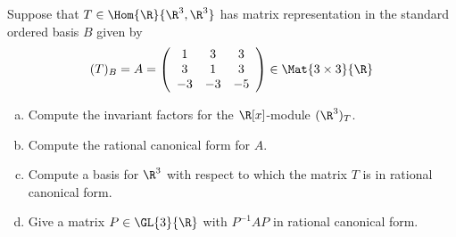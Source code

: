 \documentclass[10pt]{amsart}
\begin{document}
\begin{thm}
  Suppose that $T \in \Hom{\R}{\R^3, \R^3}$ has matrix representation in the standard ordered basis $B$ given by 
  $$(T)_B = A = \left(
  \begin{array}{ccc}
    1 & 3 & 3\\
    3 & 1 & 3\\
    -3 & -3 & -5
  \end{array}
  \right) \in \Mat{3 \times 3}{\R}$$
  \begin{enumerate}[(a)]
  \item
    Compute the invariant factors for the $\R[x]$-module $(\R^3)_T$.
  \item
    Compute the rational canonical form for $A$.
  \item
    Compute a basis for $\R^3$ with respect to which the matrix $T$ is in rational canonical form.
  \item
    Give a matrix $P \in \GL{3}{\R}$ with $P^{-1}AP$ in rational canonical form.
  \end{enumerate}
  

\end{thm}
\end{document}
